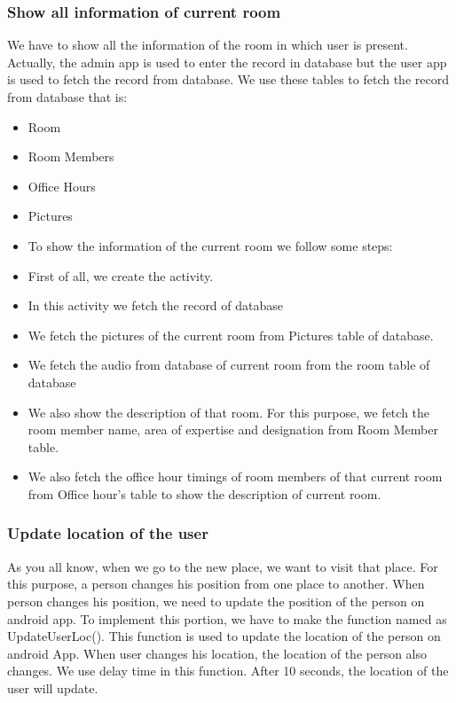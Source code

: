 \subsubsection{Show all information of current room}
We have to show all the information of the room in which user is present. Actually, the admin app is used to enter the record in database but the user app is used to fetch the record from database. We use these tables to fetch the record from database that is:
\begin{itemize}
\item Room 
\item Room Members
\item Office Hours
\item Pictures
\item To show the information of the current room we follow some steps:
\item First of all, we create the activity.
\item In this activity we fetch the record of database
\item We fetch the pictures of the current room from Pictures table of database.
\item We fetch the audio from database of current room from the room table of database
\item We also show the description of that room. For this purpose, we fetch the room member name, area of expertise and designation from Room Member table.
\item We also fetch the office hour timings of room members of that current room from Office hour’s table to show the description of current room.
\end{itemize}


\subsubsection{Update location of the user}
As you all know, when we go to the new place, we want to visit that place. For this purpose, a person changes his position from one place to another. When person changes his position, we need to update the position of the person on android app. To implement this portion, we have to make the function named as UpdateUserLoc().  This function is used to update the location of the person on android App. When user changes his location, the location of the person also changes. We use delay time in this function. After 10 seconds, the location of the user will update.
